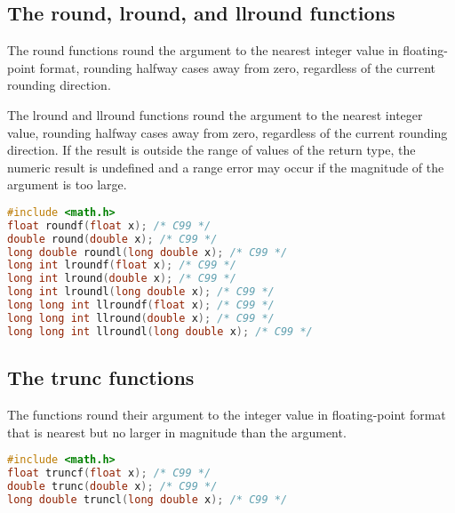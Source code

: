 \subsection{The round, lround, and llround functions}
The round functions round the argument to the nearest integer value in
floating-point format, rounding halfway cases away from zero, regardless of the
current rounding direction.

The lround and llround functions round the argument to the nearest integer
value, rounding halfway cases away from zero, regardless of the current
rounding direction. If the result is outside the range of values of the return
type, the numeric result is undefined and a range error may occur if the
magnitude of the argument is too large.
\lstset{basicstyle=\scriptsize, numbers=left, captionpos=b, tabsize=4}
\begin{lstlisting}[caption=Section \thesection listing \arabic{furthermathcnt},language={C},
breaklines=true,xleftmargin=15pt,label=lst:section\thesection listing\arabic{furthermathcnt}]
#include <math.h>
float roundf(float x); /* C99 */
double round(double x); /* C99 */
long double roundl(long double x); /* C99 */
long int lroundf(float x); /* C99 */
long int lround(double x); /* C99 */
long int lroundl(long double x); /* C99 */
long long int llroundf(float x); /* C99 */
long long int llround(double x); /* C99 */
long long int llroundl(long double x); /* C99 */
\end{lstlisting}

\subsection{The trunc functions}
The functions round their argument to the integer value in floating-point
format that is nearest but no larger in magnitude than the argument.
\lstset{basicstyle=\scriptsize, numbers=left, captionpos=b, tabsize=4}
\begin{lstlisting}[caption=Section \thesection listing \arabic{furthermathcnt},language={C},
breaklines=true,xleftmargin=15pt,label=lst:section\thesection listing\arabic{furthermathcnt}]
#include <math.h>
float truncf(float x); /* C99 */
double trunc(double x); /* C99 */
long double truncl(long double x); /* C99 */
\end{lstlisting}

